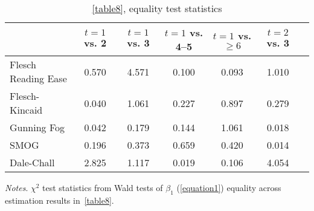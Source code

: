 \begin{table}[H]
    \footnotesize
    \centering
    \begin{threeparttable}
        \caption{\autoref{table8}, equality test statistics}
        \label{tableC6}
        \begin{tabular}{p{3cm}S@{}S@{}S@{}S@{}S@{}S@{}}
            \toprule
            &{\(t=1\) vs. 2}&{\(t=1\) vs. 3}&{\(t=1\) vs. 4--5}&{\(t=1\) vs. \(\ge6\)}&{\(t=2\) vs. 3}\\
            \midrule
            Flesch Reading Ease &       0.570&       4.571&       0.100&       0.093&       1.010\\
            Flesch-Kincaid      &       0.040&       1.061&       0.227&       0.897&       0.279\\
            Gunning Fog         &       0.042&       0.179&       0.144&       1.061&       0.018\\
            SMOG                &       0.196&       0.373&       0.659&       0.420&       0.014\\
            Dale-Chall          &       2.825&       1.117&       0.019&       0.106&       4.054\\
            \bottomrule
        \end{tabular}
        \begin{tablenotes}
            \tiny
            \item \textit{Notes}. \(\chi^2\) test statistics from Wald tests of \(\beta_1\) (\autoref{equation1}) equality across estimation results in~\autoref{table8}.
        \end{tablenotes}
    \end{threeparttable}
\end{table}